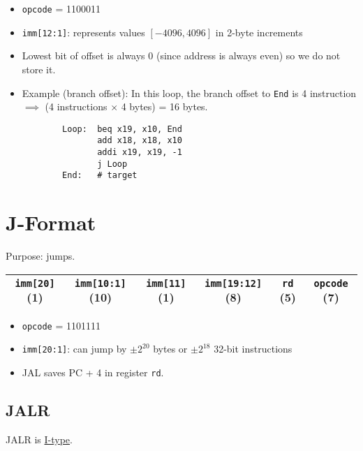 \medskip
\begin{table}
\end{table}
\begin{itemize}
    \item \texttt{opcode} = 1100011
    \item \texttt{imm[12:1]}: represents values \([-4096, 4096]\) in 2-byte increments
    \item Lowest bit of offset is always 0 (since address is always even) so we do not store it.
    \item Example (branch offset): In this loop, the branch offset to \texttt{End} is 4 instruction \(\implies\) (4 instructions \(\times\) 4 bytes) = 16 bytes.
        \begin{verbatim}
        Loop:  beq x19, x10, End
               add x18, x18, x10
               addi x19, x19, -1
               j Loop
        End:   # target
    \end{verbatim}
\end{itemize}

\section{J-Format}
Purpose: jumps.

\medskip
\begin{tabular}{|c|c|c|c|c|c|}
    \hline
    \texttt{imm[20]} (1) &
    \texttt{imm[10:1]} (10) &
    \texttt{imm[11]} (1) &
    \texttt{imm[19:12]} (8) &
    \texttt{rd} (5) &
    \texttt{opcode} (7) \\
    \hline
\end{tabular}
\begin{itemize}
    \item \texttt{opcode} = 1101111
    \item \texttt{imm[20:1]}: can jump by \(\pm 2^{20}\) bytes or \(\pm 2^{18}\) 32-bit instructions
    \item JAL saves PC + 4 in register \texttt{rd}.
\end{itemize}

\subsection{JALR}
JALR is \underline{I-type}.

